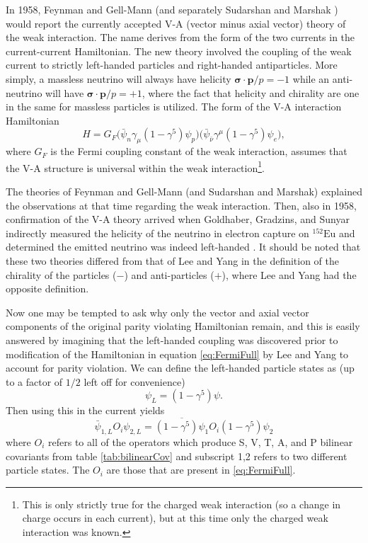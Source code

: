 In 1958, Feynman and Gell-Mann \cite{feynman1958} (and separately Sudarshan and Marshak
\cite{sudarshan1958}) would report the currently accepted V-A (vector minus axial vector)
theory of the weak interaction. The name derives from the form of the two currents in the
current-current Hamiltonian.
The new theory involved the coupling of the weak current to strictly left-handed particles and right-handed
antiparticles. More simply, a massless neutrino will always have helicity
$\boldsymbol{\sigma \cdot p}/p = -1$ while an anti-neutrino will have $\boldsymbol{\sigma \cdot p}/p = +1$,
where the fact that helicity and chirality are one in the same for massless particles is utilized.
The form of the V-A interaction Hamiltonian
%
\begin{equation}
  H = G_F \Big(\bar{\psi}_n \gamma_\mu(1-\gamma^5)\psi_p \Big)\Big(\bar{\psi}_{\bar{\nu}} \gamma^\mu(1-\gamma^5)\psi_e \Big),
  \label{eq:VminusA}
\end{equation}
%
where $G_F$ is the Fermi coupling constant of the weak interaction,
assumes that the V-A structure is universal within the weak interaction\footnote{This is
  only strictly true for the charged weak interaction (so a change in charge occurs in each current),
  but at this time only the charged weak interaction
  was known.}.

The theories of Feynman and Gell-Mann (and Sudarshan and Marshak)
explained the observations at that time
regarding the weak interaction. Then, also in 1958, confirmation of the V-A theory arrived when
Goldhaber, Gradzins, and Sunyar indirectly measured
the helicity of the neutrino in electron capture on $^{152}\mathrm{Eu}$ and determined the
emitted neutrino was indeed left-handed
\cite{goldhaber1958,greiner1996}. It should be noted that these two theories differed from that of
Lee and Yang in the definition of the chirality of the particles ($-$) and anti-particles ($+$), where
Lee and Yang had the opposite definition.

Now one may be tempted to ask why only the vector and axial vector components of the original
parity violating Hamiltonian remain, and this is easily answered by imagining that the
left-handed coupling was discovered prior to modification of the Hamiltonian in equation
\ref{eq:FermiFull} by Lee and Yang to account for parity violation. We can define the left-handed
particle states as (up to a factor of $1/2$ left off for convenience)
%
\begin{equation}
  \psi_L = (1-\gamma^5)\psi.
\end{equation}
%
Then using this in the current yields
%
\begin{equation}
  \bar{\psi}_{1,L} O_i \psi_{2,L} = \overline{(1-\gamma^5)\psi_{1}} O_i (1-\gamma^5)\psi_{2}
\end{equation}
%
where $O_i$ refers to all of the operators which produce S, V, T, A, and P bilinear covariants
from table \ref{tab:bilinearCov} and subscript 1,2 refers to two different particle states.
The $O_i$ are those that are present in \ref{eq:FermiFull}.

